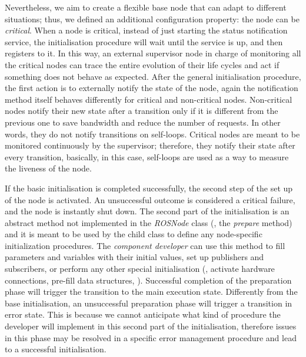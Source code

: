 Nevertheless, we aim to create a flexible base node that can adapt to different situations; thus, we defined an additional configuration property: the node can be \textit{critical}. When a node is critical, instead of just starting the status notification service, the initialisation procedure will wait until the service is up, and then registers to it. In this way, an external supervisor node in charge of monitoring all the critical nodes can trace the entire evolution of their life cycles and act if something does not behave as expected. After the general initialisation procedure, the first action is to externally notify the state of the node, again the notification method itself behaves differently for critical and non-critical nodes. Non-critical nodes notify their new state after a transition only if it is different from the previous one to save bandwidth and reduce the number of requests. In other words, they do not notify transitions on self-loops. Critical nodes are meant to be monitored continuously by the supervisor; therefore, they notify their state after every transition, basically, in this case, self-loops are used as a way to measure the liveness of the node.

If the basic initialisation is completed successfully, the second step of the set up of the node is activated. An unsuccessful outcome is considered a critical failure, and the node is instantly shut down. The second part of the initialisation is an abstract method not implemented in the \textit{ROSNode} class (\ie, the \textit{prepare} method) and it is meant to be used by the child class to define any node-specific initialization procedures. The \textit{component developer} can use this method to fill parameters and variables with their initial values, set up publishers and subscribers, or perform any other special initialisation (\eg, activate hardware connections, pre-fill data structures, \etc). Successful completion of the preparation phase will trigger the transition to the main execution state. Differently from the base initialisation, an unsuccessful preparation phase will trigger a transition in error state. This is because we cannot anticipate what kind of procedure the developer will implement in this second part of the initialisation, therefore issues in this phase may be resolved in a specific error management procedure and lead to a successful initialisation.

